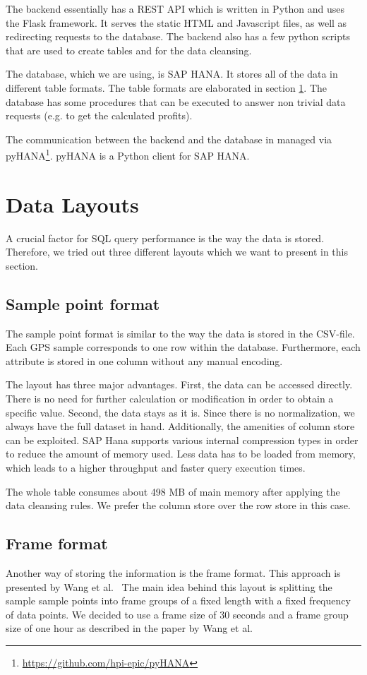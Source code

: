 \documentclass[10pt]{sig-alternate}
\begin{document}
The backend essentially has a REST API which is written in Python and uses the Flask framework. It serves the static HTML and Javascript files, as well as redirecting requests to the database. The backend also has a few python scripts that are used to create tables and for the data cleansing.

The database, which we are using, is SAP HANA. It stores all of the data in different table formats. The table formats are elaborated in section \ref{sec:data_layouts}. The database has some procedures that can be executed to answer non trivial data requests (e.g. to get the calculated profits). 

The communication between the backend and the database in managed via pyHANA\footnote{\href{https://github.com/hpi-epic/pyHANA}{https://github.com/hpi-epic/pyHANA}}. pyHANA is a Python client for SAP HANA.


\section{Data Layouts}
\label{sec:data_layouts}
A crucial factor for SQL query performance is the way the data is stored. Therefore, we tried out three different layouts which we want to present in this section.
\subsection{Sample point format}
The sample point format is similar to the way the data is stored in the CSV-file. Each GPS sample corresponds to one row within the database. Furthermore, each attribute is stored in one column without any manual encoding.

The layout has three major advantages. First, the data can be accessed directly. There is no need for further calculation or modification in order to obtain a specific value. Second, the data stays as it is. Since there is no normalization, we always have the full dataset in hand. Additionally, the amenities of column store can be exploited. SAP Hana supports various internal compression types in order to reduce the amount of memory used. Less data has to be loaded from memory, which leads to a higher throughput and faster query execution times.

The whole table consumes about 498 MB of main memory after applying the data cleansing rules. We prefer the column store over the row store in this case.

\subsection{Frame format}
Another way of storing the information is the frame format. This approach is presented by Wang et al.~\cite{wang} The main idea behind this layout is splitting the sample sample points into frame groups of a fixed length with a fixed frequency of data points. We decided to use a frame size of 30 seconds and a frame group size of one hour as described in the paper by Wang et al.
\end{document}
